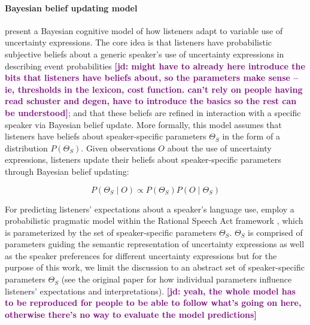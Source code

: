 \documentclass[man,floatsintext]{apa6}
\newcommand{\jd}[1]{\textcolor{Purple}{\bf [jd: #1]}}
\begin{document}
\paragraph{Bayesian belief updating model}  present a Bayesian cognitive model %
of how listeners adapt to variable use of uncertainty expressions. The core idea is that listeners have probabilistic subjective beliefs about a generic speaker's use of uncertainty expressions in describing event probabilities \jd{might have to already here introduce the bits that listeners have beliefs about, so the parameters make sense -- ie, thresholds in the lexicon, cost function. can't rely on people having read schuster and degen, have to introduce the basics so the rest can be understood}; and that these beliefs are refined in interaction with a specific speaker via Bayesian belief update. More formally, this model assumes that listeners have beliefs about speaker-specific parameters $\Theta_S$ in the form of a distribution $P(\Theta_S)$. Given observations $O$ about the use of uncertainty expressions, listeners update their beliefs about speaker-specific parameters through Bayesian belief updating:

$$ P(\Theta_S \mid O) \propto P(\Theta_S) P(O \mid \Theta_S) $$

For predicting listeners' expectations about a speaker's language use,  employ a probabilistic pragmatic model within the Rational Speech Act framework \cite{Goodman2016}, which is parameterized by the set of speaker-specific parameters $\Theta_S$. $\Theta_S$ is comprised of parameters guiding the semantic representation of uncertainty expressions as well as the speaker preferences for different uncertainty expressions but for the purpose of this work, we limit the discussion to an abstract set of speaker-specific parameters $\Theta_S$ (see the original paper for how individual parameters influence listeners' expectations and interpretations). \jd{yeah, the whole model has to be reproduced for people to be able to follow what's going on here, otherwise there's no way to evaluate the model predictions}
\end{document}
